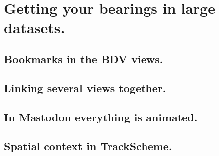 \section{Getting your bearings in large datasets.}

\subsection{Bookmarks in the BDV views.}

\subsection{Linking several views together.}

\subsection{In Mastodon everything is animated.}

\subsection{Spatial context in TrackScheme.}